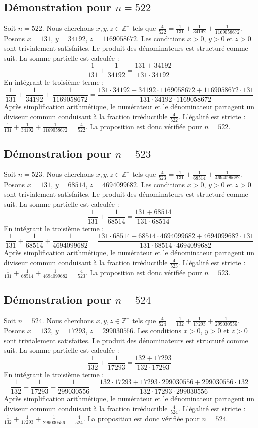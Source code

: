 \documentclass[11pt,a4paper]{article}
\begin{document}
\subsection{Démonstration pour $n = 522$}
Soit $n = 522$. Nous cherchons $x, y, z \in \mathbb{Z}^{+}$ tels que $\frac{4}{522} = \frac{1}{131} + \frac{1}{34192} + \frac{1}{1169058672}$.
Posons $x = 131$, $y = 34192$, $z = 1169058672$.
Les conditions $x > 0$, $y > 0$ et $z > 0$ sont trivialement satisfaites.
Le produit des dénominateurs est structuré comme suit. La somme partielle est calculée :
$$ \frac{1}{131} + \frac{1}{34192} = \frac{131+34192}{131 \cdot 34192} $$
En intégrant le troisième terme :
$$ \frac{1}{131} + \frac{1}{34192} + \frac{1}{1169058672} = \frac{131 \cdot 34192 + 34192 \cdot 1169058672 + 1169058672 \cdot 131}{131 \cdot 34192 \cdot 1169058672} $$
Après simplification arithmétique, le numérateur et le dénominateur partagent un diviseur commun conduisant à la fraction irréductible $\frac{4}{522}$.
L'égalité est stricte : $\frac{1}{131} + \frac{1}{34192} + \frac{1}{1169058672} = \frac{4}{522}$.
La proposition est donc vérifiée pour $n = 522$.
\subsection{Démonstration pour $n = 523$}
Soit $n = 523$. Nous cherchons $x, y, z \in \mathbb{Z}^{+}$ tels que $\frac{4}{523} = \frac{1}{131} + \frac{1}{68514} + \frac{1}{4694099682}$.
Posons $x = 131$, $y = 68514$, $z = 4694099682$.
Les conditions $x > 0$, $y > 0$ et $z > 0$ sont trivialement satisfaites.
Le produit des dénominateurs est structuré comme suit. La somme partielle est calculée :
$$ \frac{1}{131} + \frac{1}{68514} = \frac{131+68514}{131 \cdot 68514} $$
En intégrant le troisième terme :
$$ \frac{1}{131} + \frac{1}{68514} + \frac{1}{4694099682} = \frac{131 \cdot 68514 + 68514 \cdot 4694099682 + 4694099682 \cdot 131}{131 \cdot 68514 \cdot 4694099682} $$
Après simplification arithmétique, le numérateur et le dénominateur partagent un diviseur commun conduisant à la fraction irréductible $\frac{4}{523}$.
L'égalité est stricte : $\frac{1}{131} + \frac{1}{68514} + \frac{1}{4694099682} = \frac{4}{523}$.
La proposition est donc vérifiée pour $n = 523$.
\subsection{Démonstration pour $n = 524$}
Soit $n = 524$. Nous cherchons $x, y, z \in \mathbb{Z}^{+}$ tels que $\frac{4}{524} = \frac{1}{132} + \frac{1}{17293} + \frac{1}{299030556}$.
Posons $x = 132$, $y = 17293$, $z = 299030556$.
Les conditions $x > 0$, $y > 0$ et $z > 0$ sont trivialement satisfaites.
Le produit des dénominateurs est structuré comme suit. La somme partielle est calculée :
$$ \frac{1}{132} + \frac{1}{17293} = \frac{132+17293}{132 \cdot 17293} $$
En intégrant le troisième terme :
$$ \frac{1}{132} + \frac{1}{17293} + \frac{1}{299030556} = \frac{132 \cdot 17293 + 17293 \cdot 299030556 + 299030556 \cdot 132}{132 \cdot 17293 \cdot 299030556} $$
Après simplification arithmétique, le numérateur et le dénominateur partagent un diviseur commun conduisant à la fraction irréductible $\frac{4}{524}$.
L'égalité est stricte : $\frac{1}{132} + \frac{1}{17293} + \frac{1}{299030556} = \frac{4}{524}$.
La proposition est donc vérifiée pour $n = 524$.
\end{document}
